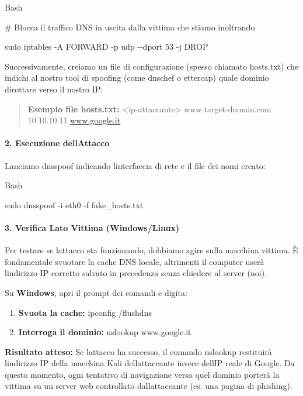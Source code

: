 \documentclass[11pt,a4paper]{article}
\begin{document}
Bash

\# Blocca il traffico DNS in uscita dalla vittima che stiamo inoltrando

sudo iptables -A FORWARD -p udp -\/-dport 53 -j DROP

Successivamente, creiamo un file di configurazione (spesso chiamato
hosts.txt) che indichi al nostro tool di spoofing (come dnschef o
ettercap) quale dominio dirottare verso il nostro IP:

\begin{quote}
\textbf{Esempio file hosts.txt:} \textless ip-attaccante\textgreater{}
www.target-domain.com 10.10.10.11
\href{http://www.google.it/}{www.google.it}
\end{quote}

\paragraph{\texorpdfstring{\textbf{2. Esecuzione
dell\textquotesingle Attacco}}{2. Esecuzione dell\textquotesingle Attacco}}\label{esecuzione-dellattacco}

Lanciamo dnsspoof indicando l\textquotesingle interfaccia di rete e il
file dei nomi creato:

Bash

sudo dnsspoof -i eth0 -f fake\_hosts.txt

\paragraph{3. Verifica Lato Vittima
(Windows/Linux)}\label{verifica-lato-vittima-windowslinux}

Per testare se l\textquotesingle attacco sta funzionando, dobbiamo agire
sulla macchina vittima. È fondamentale svuotare la cache DNS locale,
altrimenti il computer userà l\textquotesingle indirizzo IP corretto
salvato in precedenza senza chiedere al server (noi).

Su \textbf{Windows}, apri il prompt dei comandi e digita:

\begin{enumerate}
\def\labelenumi{\arabic{enumi}.}
\item
  \textbf{Svuota la cache:} ipconfig /flushdns
\item
  \textbf{Interroga il dominio:} nslookup www.google.it
\end{enumerate}

\textbf{Risultato atteso:} Se l\textquotesingle attacco ha successo, il
comando nslookup restituirà l\textquotesingle indirizzo IP della
macchina Kali dell\textquotesingle attaccante invece
dell\textquotesingle IP reale di Google. Da questo momento, ogni
tentativo di navigazione verso quel dominio porterà la vittima su un
server web controllato dall\textquotesingle attaccante (es. una pagina
di phishing).
\end{document}
